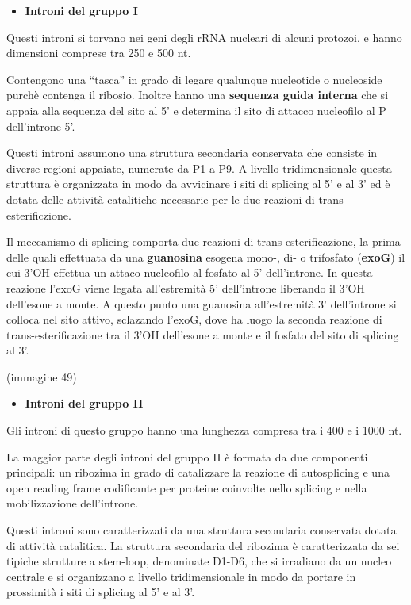 \documentclass[]{article}
\begin{document}
\begin{itemize}
\itemsep1pt\parskip0pt
\item
  \textbf{Introni del gruppo I}
\end{itemize}

Questi introni si torvano nei geni degli rRNA nucleari di alcuni
protozoi, e hanno dimensioni comprese tra 250 e 500 nt.

Contengono una ``tasca'' in grado di legare qualunque nucleotide o
nucleoside purchè contenga il ribosio. Inoltre hanno una
\textbf{sequenza guida interna} che si appaia alla sequenza del sito al
5' e determina il sito di attacco nucleofilo al P dell'introne 5'.

Questi introni assumono una struttura secondaria conservata che consiste
in diverse regioni appaiate, numerate da P1 a P9. A livello
tridimensionale questa struttura è organizzata in modo da avvicinare i
siti di splicing al 5' e al 3' ed è dotata delle attività catalitiche
necessarie per le due reazioni di trans-esterificzione.

Il meccanismo di splicing comporta due reazioni di
trans-esterificazione, la prima delle quali effettuata da una
\textbf{guanosina} esogena mono-, di- o trifosfato (\textbf{exoG}) il
cui 3'OH effettua un attaco nucleofilo al fosfato al 5' dell'introne. In
questa reazione l'exoG viene legata all'estremità 5' dell'introne
liberando il 3'OH dell'esone a monte. A questo punto una guanosina
all'estremità 3' dell'introne si colloca nel sito attivo, sclazando
l'exoG, dove ha luogo la seconda reazione di trans-esterificazione tra
il 3'OH dell'esone a monte e il fosfato del sito di splicing al 3'.

(immagine 49)

\begin{itemize}
\itemsep1pt\parskip0pt
\item
  \textbf{Introni del gruppo II}
\end{itemize}

Gli introni di questo gruppo hanno una lunghezza compresa tra i 400 e i
1000 nt.

La maggior parte degli introni del gruppo II è formata da due componenti
principali: un ribozima in grado di catalizzare la reazione di
autosplicing e una open reading frame codificante per proteine coinvolte
nello splicing e nella mobilizzazione dell'introne.

Questi introni sono caratterizzati da una struttura secondaria
conservata dotata di attività catalitica. La struttura secondaria del
ribozima è caratterizzata da sei tipiche strutture a stem-loop,
denominate D1-D6, che si irradiano da un nucleo centrale e si
organizzano a livello tridimensionale in modo da portare in prossimità i
siti di splicing al 5' e al 3'.
\end{document}
